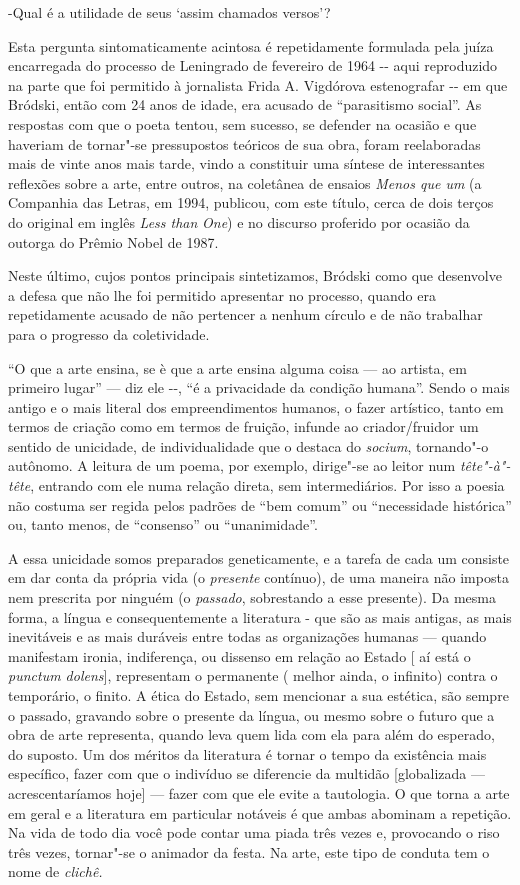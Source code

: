 -Qual é a utilidade de seus `assim chamados versos'?

Esta pergunta sintomaticamente acintosa é repetidamente formulada pela
juíza encarregada do processo de Leningrado de fevereiro de 1964 -\/-
aqui reproduzido na parte que foi permitido à jornalista Frida A.
Vigdórova estenografar -\/- em que Bródski, então com 24 anos de idade,
era acusado de ``parasitismo social''. As respostas com que o poeta
tentou, sem sucesso, se defender na ocasião e que haveriam de tornar"-se
pressupostos teóricos de sua obra, foram reelaboradas mais de vinte anos
mais tarde, vindo a constituir uma síntese de interessantes reflexões
sobre a arte, entre outros, na coletânea de ensaios \emph{Menos que um}
(a Companhia das Letras, em 1994, publicou, com este título, cerca de
dois terços do original em inglês \emph{Less than} \emph{One}) e no
discurso proferido por ocasião da outorga do Prêmio Nobel de 1987.

Neste último, cujos pontos principais sintetizamos, Bródski como que
desenvolve a defesa que não lhe foi permitido apresentar no processo,
quando era repetidamente acusado de não pertencer a nenhum círculo e de
não trabalhar para o progresso da coletividade.

``O que a arte ensina, se è que a arte ensina alguma coisa --- ao
artista, em primeiro lugar'' --- diz ele -\/-, ``é a privacidade da
condição humana''. Sendo o mais antigo e o mais literal dos
empreendimentos humanos, o fazer artístico, tanto em termos de criação
como em termos de fruição, infunde ao criador/fruidor um sentido de
unicidade, de individualidade que o destaca do \emph{socium}, tornando"-o
autônomo. A leitura de um poema, por exemplo, dirige"-se ao leitor num
\emph{tête"-à"-tête}, entrando com ele numa relação direta, sem
intermediários. Por isso a poesia não costuma ser regida pelos padrões
de ``bem comum'' ou ``necessidade histórica'' ou, tanto menos, de
``consenso'' ou ``unanimidade''.

A essa unicidade somos preparados geneticamente, e a tarefa de cada um
consiste em dar conta da própria vida (o \emph{presente} contínuo), de
uma maneira não imposta nem prescrita por ninguém (o \emph{passado},
sobrestando a esse presente). Da mesma forma, a língua e
consequentemente a literatura - que são as mais antigas, as mais
inevitáveis e as mais duráveis entre todas as organizações humanas ---
quando manifestam ironia, indiferença, ou dissenso em relação ao Estado
{[} aí está o \emph{punctum dolens}{]}, representam o permanente (
melhor ainda, o infinito) contra o temporário, o finito. A ética do
Estado, sem mencionar a sua estética, são sempre o passado, gravando
sobre o presente da língua, ou mesmo sobre o futuro que a obra de arte
representa, quando leva quem lida com ela para além do esperado, do
suposto. Um dos méritos da literatura é tornar o tempo da existência
mais específico, fazer com que o indivíduo se diferencie da multidão
{[}globalizada --- acrescentaríamos hoje{]} --- fazer com que ele evite a
tautologia. O que torna a arte em geral e a literatura em particular
notáveis é que ambas abominam a repetição. Na vida de todo dia você pode
contar uma piada três vezes e, provocando o riso três vezes, tornar"-se o
animador da festa. Na arte, este tipo de conduta tem o nome de
\emph{clichê.}

